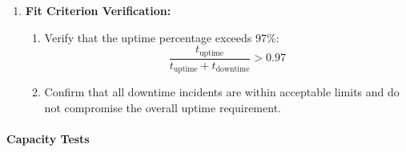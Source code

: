 \documentclass[12pt, titlepage]{article}
\begin{document}
\begin{enumerate}
\begin{enumerate}
    \item \textbf{Fit Criterion Verification:}
    \begin{enumerate}
        \item Verify that the uptime percentage exceeds 97\%:
        \[
        \frac{t_{\text{uptime}}}{t_{\text{uptime}} + t_{\text{downtime}}} > 0.97
        \]
        \item Confirm that all downtime incidents are within acceptable limits and do not compromise the overall uptime requirement.
    \end{enumerate}
    
\end{enumerate}
\end{enumerate}

\paragraph{Capacity Tests}
\end{document}
